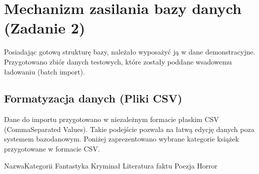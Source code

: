 \documentclass[letterpaper,10pt,english]{sphinxmanual}
\begin{document}
\begin{sphinxVerbatim}[commandchars=\\\{\}]
\end{sphinxVerbatim}


\section{Mechanizm zasilania bazy danych (Zadanie 2)}
\label{\detokenize{rozdzial_4/index:mechanizm-zasilania-bazy-danych-zadanie-2}}
\sphinxAtStartPar
Posiadając gotową strukturę bazy, należało wyposażyć ją w dane demonstracyjne. Przygotowano zbiór danych testowych, które zostały poddane wsadowemu ładowaniu (batch import).


\subsection{Formatyzacja danych (Pliki CSV)}
\label{\detokenize{rozdzial_4/index:formatyzacja-danych-pliki-csv}}
\sphinxAtStartPar
Dane do importu przygotowano w niezależnym formacie płaskim CSV (Comma\sphinxhyphen{}Separated Values). Takie podejście pozwala na łatwą edycję danych poza systemem bazodanowym. Poniżej zaprezentowano wybrane kategorie książek przygotowane w formacie CSV.

\begin{sphinxVerbatim}[commandchars=\\\{\}]
Nazwa\PYGZus{}Kategorii
Fantastyka
Kryminał
Literatura faktu
Poezja
Horror
\end{sphinxVerbatim}
\end{document}
